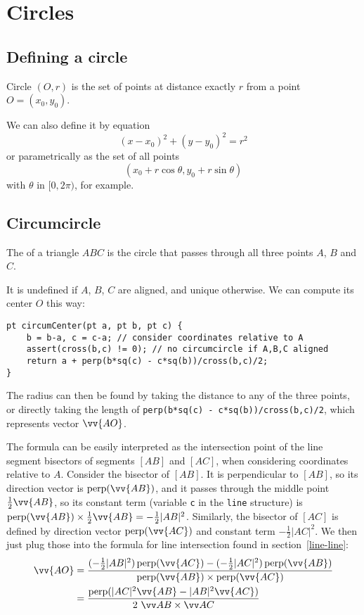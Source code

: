 \section{Circles}

\subsection{Defining a circle}
Circle $(O,r)$ is the set of points at distance exactly $r$ from a point $O=(x_0,y_0)$.

We can also define it by equation
\[(x-x_0)^2 + (y-y_0)^2 = r^2\]
or parametrically as the set of all points
\[(x_0+r\cos\theta, y_0+r\sin\theta)\]
with $\theta$ in $[0,2\pi)$, for example.


\subsection{Circumcircle}
The  of a triangle $ABC$ is the circle that passes through all three points $A$, $B$ and $C$.


It is undefined if $A$, $B$, $C$ are aligned, and unique otherwise. We can compute its center $O$ this way:
\begin{lstlisting}
pt circumCenter(pt a, pt b, pt c) {
    b = b-a, c = c-a; // consider coordinates relative to A
    assert(cross(b,c) != 0); // no circumcircle if A,B,C aligned
    return a + perp(b*sq(c) - c*sq(b))/cross(b,c)/2;
}
\end{lstlisting}

The radius can then be found by taking the distance to any of the three points, or directly taking the length of \lstinline|perp(b*sq(c) - c*sq(b))/cross(b,c)/2|, which represents vector $\vv{AO}$.

\begin{mathy}
The formula can be easily interpreted as the intersection point of the line segment bisectors of segments $[AB]$ and $[AC]$, when considering coordinates relative to $A$. Consider the bisector of $[AB]$. It is perpendicular to $[AB]$, so its direction vector is $\perpop(\vv{AB})$, and it passes through the middle point $\frac{1}{2}\vv{AB}$, so its constant term (variable \lstinline|c| in the \lstinline|line| structure) is $\perpop(\vv{AB}) \times \frac{1}{2}\vv{AB} = -\frac{1}{2}|AB|^2$. Similarly, the bisector of $[AC]$ is defined by direction vector $\perpop(\vv{AC})$ and constant term $-\frac{1}{2}|AC|^2$. We then just plug those into the formula for line intersection found in section~\ref{line-line}:
\begin{align*}
\vv{AO} &= \frac{(-\frac{1}{2}|AB|^2)\perpop(\vv{AC}) - (-\frac{1}{2}|AC|^2)\perpop(\vv{AB})}{\perpop(\vv{AB}) \times \perpop(\vv{AC})} \\
&= \frac{\perpop(|AC|^2\vv{AB} - |AB|^2\vv{AC})}{2\ \crossv{AB}{AC}}
\end{align*}
\end{mathy}


